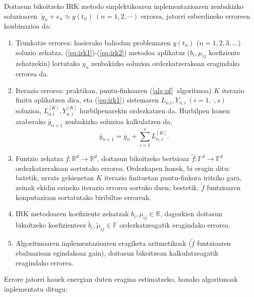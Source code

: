 Doitasun bikoitzeko IRK metodo sinplektikoaren inplementazioaren zenbakizko soluzioaren $\ \tilde{y}_n+e_n \approx y(t_n) \ (n=1,2,\cdots)$ errorea, jatorri ezberdineko erroreen konbinazioa da:
\begin{enumerate}
\item Trunkatze errorea: hasierako baliodun problemaren $y(t_n)$ ($n=1,2,3,\dots$) soluzio zehatza, (\ref{eq:irk1})-(\ref{eq:irk2}) metodoa aplikatuz  ($b_i,\mu_{ij}$ koefiziente zehatzekin) lortutako $y_n$ zenbakizko soluzioa  ordezkatzerakoan eragindako errorea da. 
\item Iterazio errorea: praktikan, puntu-finkoaren (\ref{alg:pf}~algoritmoa) $K$ iterazio finitu aplikatzen dira, eta (\ref{eq:irk1}) sistemaren $L_{n.i}, Y_{n,i} \ (i=1,\cdot,s)$ soluzioa, $L_{n.i}^{[K]}, Y_{n,i}^{[K]}$ hurbilpenarekin ordezkatzen da. Hurbilpen honen araberako $\bar{y}_{n+1}$ zenbakizko soluzioa kalkulatzen da,
\begin{equation*}
\bar{y}_{n+1}=y_{n}+\sum_{i=1}^{s} L_{n,i}^{[K]}.
\end{equation*}   
\item Funtzio zehatza $f:\mathbb{R}^d \rightarrow \mathbb{R}^d$, doitasun bikoitzeko bertsioaz $\tilde{f}:\mathbb{F}^d \rightarrow \mathbb{F}^d$ ordezkatzerakoan sortutako errorea.  Ordezkapen honek, bi eragin ditu: batetik, urrats gehienetan $K$ iterazio finituetan puntu-finkora iritsiko gara, zeinak  ekidin ezineko iterazio errorea sortuko duen; bestetik, $\tilde{f}$ funtzioaren konputazioan sortatutako biribiltze erroreak. 
\item IRK metodoaren koefiziente zehatzak $b_i,\mu_{ij} \in \mathbb{R}$, dagozkien doitasun bikoitzeko koefizienteez $\tilde{b}_i,\tilde{\mu}_{ij} \in \mathbb{F}$ ordezkatzeagatik eragindako errorea.
\item Algoritmoaren inplementazioaren eragiketa aritmetikoak ($\tilde{f}$ funtzioaren ebaluazioan egindakoaz gain), doitasun bikoitzean kalkulatzeagatik eragindako errorea.  
\end{enumerate} 

Errore jatorri hauek energian duten eragina estimatzeko, honako algoritmoak inplementatu ditugu:


